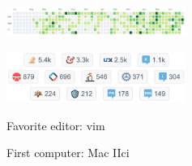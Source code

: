 \documentclass[letterpaper]{deedy-resume} %
\begin{document}
\begin{minipage}[t]{0.33\textwidth}
\sectionspace %


\includegraphics[width=2.3in]{github-work}

\sectionspace %

\includegraphics[width=2.3in]{stackoverflow-reps}

Favorite editor: vim

First computer: Mac IIci

\section{}
\section{}
\section{}

\section{}
\section{}

\section{}
\sectionspace %

\section{}
\sectionspace %

\section{}
\sectionspace %


\end{minipage}
\end{document}
